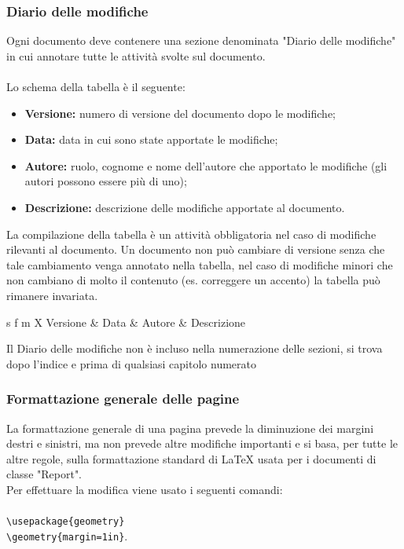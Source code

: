 \documentclass[a4paper]{report}
\begin{document}
	\subsubsection{Diario delle modifiche} 
		Ogni documento deve contenere una sezione denominata "Diario delle modifiche" in cui annotare tutte le 
		attività svolte sul documento.
		\\ \\
		Lo schema della tabella è il seguente:
		\begin{itemize}
			\item \textbf{Versione:} numero di versione del documento dopo le modifiche;
			\item \textbf{Data:} data in cui sono state apportate le modifiche;
			\item \textbf{Autore:} ruolo, cognome e nome dell'autore che apportato le modifiche (gli autori possono essere
			più di uno);
			\item \textbf{Descrizione:} descrizione delle modifiche apportate al documento.
		\end{itemize}
		La compilazione della tabella è un attività obbligatoria nel caso di modifiche rilevanti al documento. Un documento 
		non può cambiare di versione senza che tale cambiamento venga annotato nella tabella, nel caso di modifiche 
		minori che non cambiano di molto il contenuto (es. correggere un accento) la tabella può rimanere invariata.
		\begin{table}[H]
			\begin{tabularx}{\textwidth}{s f m X}
				 Versione & Data & Autore & Descrizione \\
			\end{tabularx}
			\caption{Schema del diario delle modifiche \label{tab:table_label}}
		\end{table} 
		Il Diario delle modifiche non è incluso nella numerazione delle sezioni, si trova dopo l'indice e prima di qualsiasi
		 capitolo numerato
	\subsubsection{Formattazione generale delle pagine}
		La formattazione generale di una pagina prevede la diminuzione dei margini destri e sinistri, ma non prevede
		altre modifiche importanti e si basa, per tutte le altre regole, sulla formattazione standard di \LaTeX \space 
		usata per i documenti di classe "Report".\\
		Per effettuare la modifica viene usato i seguenti comandi: \\ \\
		\verb|\usepackage{geometry}| \\ \verb|\geometry{margin=1in}|. \\
\end{document}
